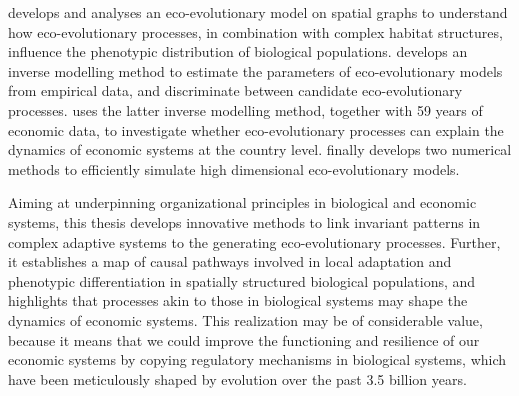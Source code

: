 \Cref{\chapi} develops and analyses an eco-evolutionary model on spatial graphs to understand how eco-evolutionary processes, in combination with complex habitat structures, influence the phenotypic distribution of biological populations. \Cref{\chapii} develops an inverse modelling method to estimate the parameters of eco-evolutionary models from empirical data, and discriminate between candidate eco-evolutionary processes. \Cref{\chapiv} uses the latter inverse modelling method, together with 59 years of economic data, to investigate whether eco-evolutionary processes can explain the dynamics of economic systems at the country level. \Cref{\chapiv} finally develops two numerical methods to efficiently simulate high dimensional eco-evolutionary models.

Aiming at underpinning organizational principles in biological and economic systems, this thesis develops innovative methods to link invariant patterns in complex adaptive systems to the generating eco-evolutionary processes. Further, it establishes a map of causal pathways involved in local adaptation and phenotypic differentiation in spatially structured biological populations, and highlights that processes akin to those in biological systems may shape the dynamics of economic systems. This realization may be of considerable value, because it means that we could improve the functioning and resilience of our economic systems by copying regulatory mechanisms in biological systems, which have been meticulously shaped by evolution over the past 3.5 billion years. 















